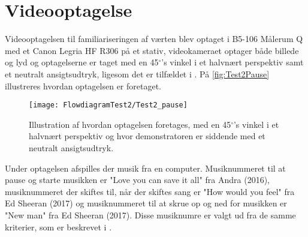 \chapter{Videooptagelse}
\label{app:VideooptagelseSocialAccept}
%
Videooptagelsen til familiariseringen af værten blev optaget i B5-106 Målerum Q med et Canon Legria HF R306 på et stativ, videokameraet optager både billede og lyd og optagelserne er taget med en 45$^\circ$'s vinkel i et halvnært perspektiv samt et neutralt ansigtsudtryk, ligesom det er tilfældet i . På \autoref{fig:Test2Pause} illustreres hvordan optagelsen er foretaget. 
%
\begin{figure}[H]
	\centering
	\texttt{[image: FlowdiagramTest2/Test2\_pause]}
	\caption{Illustration af hvordan optagelsen foretages, med en 45$^\circ$'s vinkel i et halvnært perspektiv og hvor demonstratoren er siddende med et neutralt ansigtsudtryk.}
	\label{fig:Test2Pause}
\end{figure}
\noindent
%
Under optagelsen afspilles der musik fra en computer. Musiknummeret til at pause og starte musikken er "Love you can save it all" fra Andra (2016), musiknummeret der skiftes til, når der skiftes sang er "How would you feel" fra Ed Sheeran (2017) og musiknummeret til at skrue op og ned for musikken er "New man" fra Ed Sheeran (2017). Disse musiknumre er valgt ud fra de samme kriterier, som er beskrevet i .

